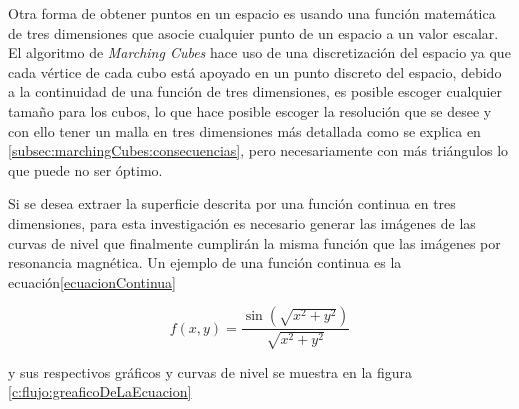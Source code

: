 Otra forma de obtener puntos en un espacio es usando una función matemática de tres dimensiones que asocie cualquier punto de un espacio a un valor escalar. El algoritmo de \emph{Marching Cubes} hace uso de una discretización del espacio ya que cada vértice de cada cubo está apoyado en un punto discreto del espacio, debido a la continuidad de una función de tres dimensiones, es posible escoger cualquier tamaño para los cubos, lo que hace posible escoger la resolución que se desee y con ello tener un malla en tres dimensiones más detallada como se explica en \ref{subsec:marchingCubes:consecuencias}, pero necesariamente con más triángulos lo que puede no ser óptimo.

Si se desea extraer la superficie descrita por una función continua en tres dimensiones, para esta investigación es necesario generar las imágenes de las curvas de nivel que finalmente cumplirán la misma función que las imágenes por resonancia magnética. Un ejemplo de una función continua es la ecuación\ref{ecuacionContinua}

\begin{equation}
f(x,y) = \frac{ \sin{(\sqrt{x^2+y^2})} }{ \sqrt{x^2+y^2} }
\label{ecuacionContinua}
\end{equation}

y sus respectivos gráficos y curvas de nivel se muestra en la figura \ref{c:flujo:greaficoDeLaEcuacion}

